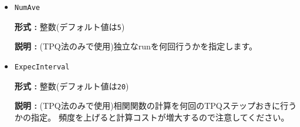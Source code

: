 \begin{itemize}
\begin{itemize}
\end{itemize}

\item \verb|NumAve|

{\bf 形式 :} 整数(デフォルト値は\verb|5|)

{\bf 説明 :} (TPQ法のみで使用)独立なrunを何回行うかを指定します。

\item \verb|ExpecInterval|

{\bf 形式 :} 整数(デフォルト値は\verb|20|)

{\bf 説明 :} (TPQ法のみで使用)相関関数の計算を何回のTPQステップおきに行うかの指定。
頻度を上げると計算コストが増大するので注意してください。
\end{itemize}

